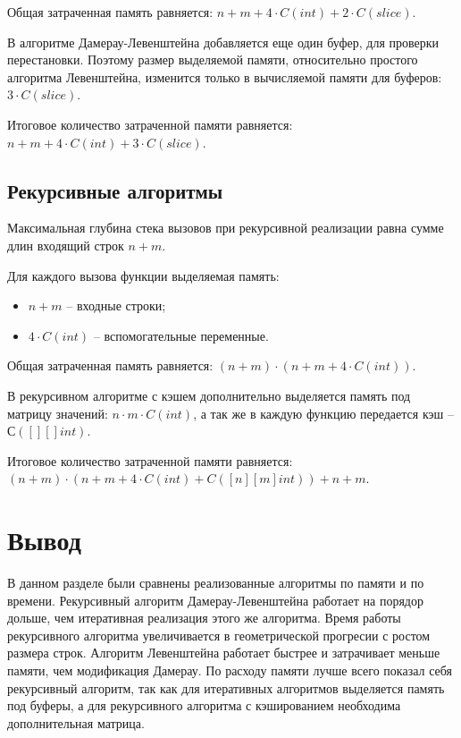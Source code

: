 Общая затраченная память равняется: $n + m + 4 \cdot C(int) + 2 \cdot C(slice)$.

В алгоритме Дамерау-Левенштейна добавляется еще один буфер, для проверки перестановки.
Поэтому размер выделяемой памяти, относительно простого алгоритма Левенштейна, изменится только в вычисляемой памяти для буферов: $3 \cdot C(slice)$.

Итоговое количество затраченной памяти равняется: $n + m + 4 \cdot C(int) + 3 \cdot C(slice)$.

\subsection{Рекурсивные алгоритмы}

Максимальная глубина стека вызовов при рекурсивной реализации равна сумме длин входящий строк $n + m$.

Для каждого вызова функции выделяемая память:
\begin{itemize}
	\item $n + m$ -- входные строки;
	\item $4 \cdot C(int) $ -- вспомогательные переменные.
\end{itemize}

Общая затраченная память равняется: $(n + m) \cdot (n + m + 4 \cdot C(int))$.

В рекурсивном алгоритме с кэшем дополнительно выделяется память под матрицу значений: $n \cdot m \cdot C(int)$, а так же в каждую функцию передается кэш -- $С([][]int)$.

Итоговое количество затраченной памяти равняется: $(n + m) \cdot (n + m + 4 \cdot C(int) + C([n][m]int)) + n + m$.

\section*{Вывод}

В данном разделе были сравнены реализованные алгоритмы по памяти и по времени.
Рекурсивный алгоритм Дамерау-Левенштейна работает на порядор дольше, чем итеративная реализация этого же алгоритма.
Время работы рекурсивного алгоритма увеличивается в геометрической прогресии с ростом размера строк.
Алгоритм Левенштейна работает быстрее и затрачивает меньше памяти, чем модификация Дамерау.
По расходу памяти лучше всего показал себя рекурсивный алгоритм, так как для итеративных алгоритмов выделяется память под буферы, а для рекурсивного алгоритма с кэшированием необходима дополнительная матрица.